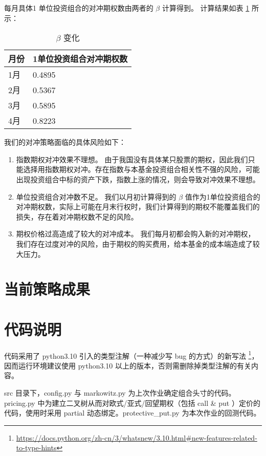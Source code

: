 \documentclass[a4paper,12pt]{ctexart}
\begin{document}
每月具体1 单位投资组合的对冲期权数由两者的 \(\beta\) 计算得到。
计算结果如表 \ref{beta} 所示：
\begin{table}[htbp]
	\centering
	\begin{tabular}{ll}
		月份 & 1单位投资组合对冲期权数 \\\hline
		1月 & 0.4895       \\
		2月 & 0.5367       \\
		3月 & 0.5895       \\
		4月 & 0.8223       \\
	\end{tabular}
	\caption{\(\beta\) 变化}
	\label{beta}
\end{table}
我们的对冲策略面临的具体风险如下：
\begin{enumerate}
	\item 指数期权对冲效果不理想。
	      由于我国没有具体某只股票的期权，因此我们只能选择用指数期权对冲。存在指数与本基金投资组合相关性不强的风险，可能出现投资组合中标的资产下跌，指数上涨的情况，则会导致对冲效果不理想。
	\item 单位投资组合对冲数不足。
	      我们以月初计算得到的 \(\beta\) 值作为1单位投资组合的对冲期权数，实际上可能在月末行权时，我们计算得到的期权不能覆盖我们的损失，存在着对冲期权数不足的风险。
	\item 期权价格过高造成了较大的对冲成本。
	      我们每月初都会购入新的对冲期权，我们存在过度对冲的风险，由于期权的购买费用，给本基金的成本端造成了较大压力。
\end{enumerate}

\section{当前策略成果}
\appendix
\section{代码说明}
代码采用了 python3.10 引入的类型注解（一种减少写 bug 的方式）的新写法
\footnote{\url{https://docs.python.org/zh-cn/3/whatsnew/3.10.html\#new-features-related-to-type-hints}}，
因而运行环境建议使用 python3.10 以上的版本，否则需删除掉类型注解的有关内容。

src 目录下，config.py 与 markowitz.py 为上次作业确定组合头寸的代码。 pricing.py 中为建立二叉树从而对欧式/亚式/回望期权（包括 call \& put ）定价的代码，使用时采用 partial 动态绑定。protective\_put.py 为本次作业的回测代码。
\end{document}

